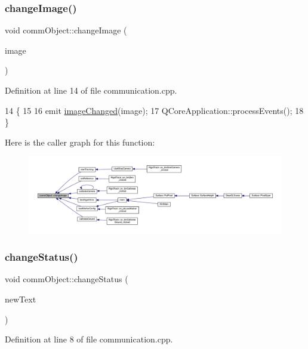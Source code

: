 \subsubsection{\texorpdfstring{change\+Image()}{changeImage()}}
{\footnotesize\ttfamily void comm\+Object\+::change\+Image (\begin{DoxyParamCaption}\item[{Q\+Pixmap}]{image }\end{DoxyParamCaption})}



Definition at line 14 of file communication.\+cpp.


\begin{DoxyCode}
14                                           \{
15 
16     emit \hyperlink{classcomm_object_a3828eab6be234f6216a6f80a6a82e41e}{imageChanged}(image);
17     QCoreApplication::processEvents();
18 \}
\end{DoxyCode}
Here is the caller graph for this function\+:
\nopagebreak
\begin{figure}[H]
\begin{center}
\leavevmode
\includegraphics[width=350pt]{classcomm_object_a6f81522c2aa1668fa402f08710e6206b_icgraph}
\end{center}
\end{figure}
\mbox{\label{classcomm_object_a1f4b8dd22ecc46bab619f6b1fe1a5144}} 
\subsubsection{\texorpdfstring{change\+Status()}{changeStatus()}}
{\footnotesize\ttfamily void comm\+Object\+::change\+Status (\begin{DoxyParamCaption}\item[{Q\+String}]{new\+Text }\end{DoxyParamCaption})}



Definition at line 8 of file communication.\+cpp.


